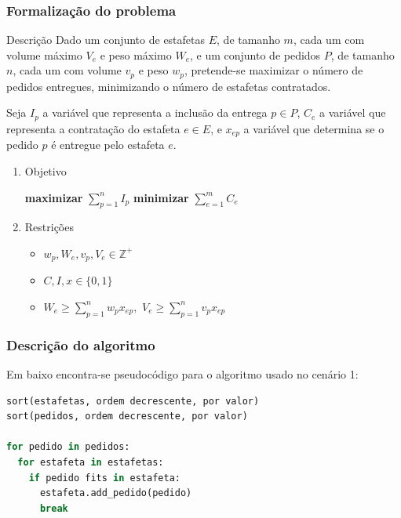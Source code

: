 \documentclass{beamer}
\begin{document}
\begin{frame}
\frametitle{Formalização do problema}
\begin{block}{Descrição}
Dado um conjunto de estafetas $E$, de tamanho $m$, cada um com volume máximo $V_{e}$ e peso máximo $W_{e}$,
e um conjunto de pedidos $P$, de tamanho $n$, cada um com volume $v_{p}$ e peso $w_{p}$, pretende-se
maximizar o número de pedidos entregues, minimizando o número de estafetas contratados.  
\end{block}

Seja $I_{p}$ a variável que representa a inclusão da entrega $p \in P$, $C_{e}$ a variável que representa
a contratação do estafeta $e \in E$, e $x_{ep}$ a variável que determina se o pedido $p$ é entregue pelo estafeta $e$.\\

\begin{enumerate}
\setlength\itemsep{1em}
\item{Objetivo}

\textbf{maximizar} $ \sum_{p = 1}^{n} I_{p} $ 
\hspace{3cm} \textbf{minimizar} $ \sum_{e = 1}^{m} C_{e} $

\item{Restrições}
\begin{itemize}
  \item $ w_{p}, W_{e}, v_{p}, V_{e} \in \mathbb{Z}^{+}$  
  \item $ C, I, x \in \{ 0, 1 \} $
  \item $ W_{e} \geq \sum_{p = 1}^{n} w_{p}x_{ep}, $ $ V_{e} \geq \sum_{p = 1}^{n} v_{p}x_{ep} $
\end{itemize}

\end{enumerate}

\end{frame}

\begin{frame}[fragile]
\frametitle{Descrição do algoritmo}
Em baixo encontra-se pseudocódigo para o algoritmo usado no cenário 1:\\
\begin{lstlisting}[language=python]
sort(estafetas, ordem decrescente, por valor)
sort(pedidos, ordem decrescente, por valor)

for pedido in pedidos:
  for estafeta in estafetas:
    if pedido fits in estafeta:
      estafeta.add_pedido(pedido)
      break
\end{lstlisting}
\end{frame}
\end{document}
